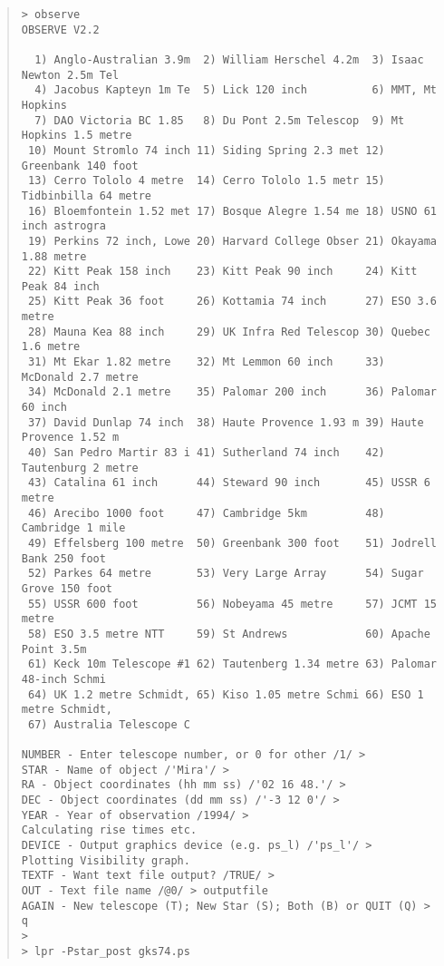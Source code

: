 \begin{quote}\small
\begin{verbatim}
> observe
OBSERVE V2.2

  1) Anglo-Australian 3.9m  2) William Herschel 4.2m  3) Isaac Newton 2.5m Tel
  4) Jacobus Kapteyn 1m Te  5) Lick 120 inch          6) MMT, Mt Hopkins
  7) DAO Victoria BC 1.85   8) Du Pont 2.5m Telescop  9) Mt Hopkins 1.5 metre
 10) Mount Stromlo 74 inch 11) Siding Spring 2.3 met 12) Greenbank 140 foot
 13) Cerro Tololo 4 metre  14) Cerro Tololo 1.5 metr 15) Tidbinbilla 64 metre
 16) Bloemfontein 1.52 met 17) Bosque Alegre 1.54 me 18) USNO 61 inch astrogra
 19) Perkins 72 inch, Lowe 20) Harvard College Obser 21) Okayama 1.88 metre
 22) Kitt Peak 158 inch    23) Kitt Peak 90 inch     24) Kitt Peak 84 inch
 25) Kitt Peak 36 foot     26) Kottamia 74 inch      27) ESO 3.6 metre
 28) Mauna Kea 88 inch     29) UK Infra Red Telescop 30) Quebec 1.6 metre
 31) Mt Ekar 1.82 metre    32) Mt Lemmon 60 inch     33) McDonald 2.7 metre
 34) McDonald 2.1 metre    35) Palomar 200 inch      36) Palomar 60 inch
 37) David Dunlap 74 inch  38) Haute Provence 1.93 m 39) Haute Provence 1.52 m
 40) San Pedro Martir 83 i 41) Sutherland 74 inch    42) Tautenburg 2 metre
 43) Catalina 61 inch      44) Steward 90 inch       45) USSR 6 metre
 46) Arecibo 1000 foot     47) Cambridge 5km         48) Cambridge 1 mile
 49) Effelsberg 100 metre  50) Greenbank 300 foot    51) Jodrell Bank 250 foot
 52) Parkes 64 metre       53) Very Large Array      54) Sugar Grove 150 foot
 55) USSR 600 foot         56) Nobeyama 45 metre     57) JCMT 15 metre
 58) ESO 3.5 metre NTT     59) St Andrews            60) Apache Point 3.5m
 61) Keck 10m Telescope #1 62) Tautenberg 1.34 metre 63) Palomar 48-inch Schmi
 64) UK 1.2 metre Schmidt, 65) Kiso 1.05 metre Schmi 66) ESO 1 metre Schmidt,
 67) Australia Telescope C

NUMBER - Enter telescope number, or 0 for other /1/ >  
STAR - Name of object /'Mira'/ > 
RA - Object coordinates (hh mm ss) /'02 16 48.'/ > 
DEC - Object coordinates (dd mm ss) /'-3 12 0'/ > 
YEAR - Year of observation /1994/ > 
Calculating rise times etc.
DEVICE - Output graphics device (e.g. ps_l) /'ps_l'/ >
Plotting Visibility graph.
TEXTF - Want text file output? /TRUE/ > 
OUT - Text file name /@0/ > outputfile
AGAIN - New telescope (T); New Star (S); Both (B) or QUIT (Q) > q
>
> lpr -Pstar_post gks74.ps
\end{verbatim}                                                            
\end{quote}

